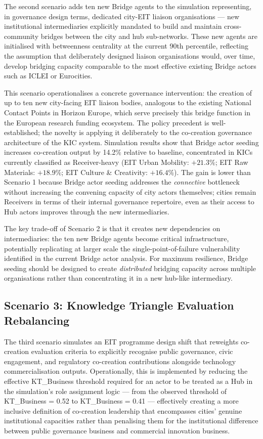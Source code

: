 \documentclass[review,12pt]{elsarticle}
\begin{document}
The second scenario adds ten new Bridge agents to the simulation representing, in governance design terms, dedicated city-EIT liaison organisations --- new institutional intermediaries explicitly mandated to build and maintain cross-community bridges between the city and hub sub-networks. These new agents are initialised with betweenness centrality at the current 90th percentile, reflecting the assumption that deliberately designed liaison organisations would, over time, develop bridging capacity comparable to the most effective existing Bridge actors such as ICLEI or Eurocities.

This scenario operationalises a concrete governance intervention: the creation of up to ten new city-facing EIT liaison bodies, analogous to the existing National Contact Points in Horizon Europe, which serve precisely this bridge function in the European research funding ecosystem. The policy precedent is well-established; the novelty is applying it deliberately to the co-creation governance architecture of the KIC system. Simulation results show that Bridge actor seeding increases co-creation output by 14.2\% relative to baseline, concentrated in KICs currently classified as Receiver-heavy (EIT Urban Mobility: $+21.3\%$; EIT Raw Materials: $+18.9\%$; EIT Culture \& Creativity: $+16.4\%$). The gain is lower than Scenario 1 because Bridge actor seeding addresses the \emph{connective} bottleneck without increasing the convening capacity of city actors themselves; cities remain Receivers in terms of their internal governance repertoire, even as their access to Hub actors improves through the new intermediaries.

The key trade-off of Scenario 2 is that it creates new dependencies on intermediaries: the ten new Bridge agents become critical infrastructure, potentially replicating at larger scale the single-point-of-failure vulnerability identified in the current Bridge actor analysis. For maximum resilience, Bridge seeding should be designed to create \emph{distributed} bridging capacity across multiple organisations rather than concentrating it in a new hub-like intermediary.

\subsection{Scenario 3: Knowledge Triangle Evaluation Rebalancing}

The third scenario simulates an EIT programme design shift that reweights co-creation evaluation criteria to explicitly recognise public governance, civic engagement, and regulatory co-creation contributions alongside technology commercialisation outputs. Operationally, this is implemented by reducing the effective KT\_Business threshold required for an actor to be treated as a Hub in the simulation's role assignment logic --- from the observed threshold of KT\_Business = 0.52 to KT\_Business = 0.41 --- effectively creating a more inclusive definition of co-creation leadership that encompasses cities' genuine institutional capacities rather than penalising them for the institutional difference between public governance business and commercial innovation business.
\end{document}
